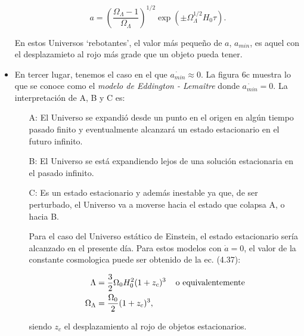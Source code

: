 \documentclass[11pt]{article}
\begin{document}
\begin{itemize}
            \begin{equation}
                a = \left(\frac{\Omega_{\Lambda} - 1}{\Omega_{\Lambda}} \right)^{1/2} \exp (\pm \Omega_{\Lambda}^{1/2} H_0 \tau).
            \end{equation}
            
            En estos Universos `rebotantes', el valor más pequeño de $a$, $a_{min}$, es aquel con el desplazamieto al rojo más grade que un objeto pueda tener. 
       
       \item En tercer lugar, tenemos el caso en el que $\dot{a_{min}} \approx 0$. La figura 6c muestra lo que se conoce como el {\textit{modelo de Eddington - Lema\^itre}} donde $\dot{a_{min}} = 0$. La interpretación de A, B y C es:
       
       \begin{itemize}
           \item[A:] El Universo se expandió desde un punto en el origen en algún tiempo pasado finito y eventualmente alcanzará un estado estacionario en el futuro infinito. 
           \item[B:] El Universo se está expandiendo lejos de una solución estacionaria en el pasado infinito. 
           \item[C:] Es un estado estacionario y además inestable ya que, de ser perturbado, el Universo va a moverse hacia el estado que colapsa A, o hacia B. 
           
           Para el caso del Universo estático de Einstein, el estado estacionario sería alcanzado en el presente día. Para estos modelos con $\dot{a} = 0$, el valor de la constante cosmologica puede ser obtenido de la ec. (4.37):
           
           \begin{align}
               \Lambda & = \frac{3}{2} \Omega_0 H_0^2 (1 + z_c)^3 \hspace{0.4cm} \text{o equivalentemente} \\
               \Omega_{\Lambda} & = \frac{\Omega_0}{2} (1 + z_c)^3,
           \end{align}
           
           siendo $z_c$ el desplazamiento al rojo de objetos estacionarios. 
       \end{itemize}
       
       
    \end{itemize}
    
    
    
\end{document}
